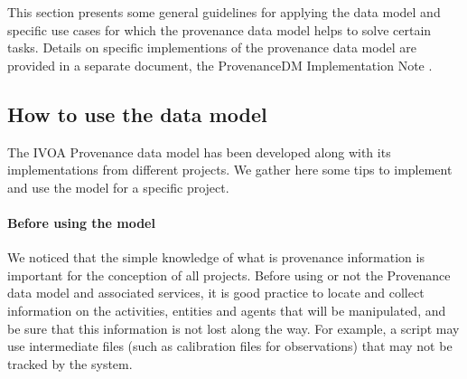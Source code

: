 %

This section presents some general guidelines for applying the data model and
specific use cases for which the provenance data model helps to solve certain tasks. Details on specific implementions of the provenance data model are provided in a separate document, the ProvenanceDM Implementation Note \citep{std:ProvenanceImplementationNote}.


\subsection{How to use the data model}

The IVOA Provenance data model has been developed along with its implementations from different projects. 
We gather here some tips to implement and use the model for a specific project.

\paragraph{Before using the model}
We noticed that the simple knowledge of what is provenance information is important for the conception of all projects. Before using or not the Provenance data model and associated services, it is good practice to locate and collect information on the activities, entities and agents that will be manipulated, and be sure that this information is not lost along the way. For example, a script may use intermediate files (such as calibration files for observations) that may not be tracked by the system.

